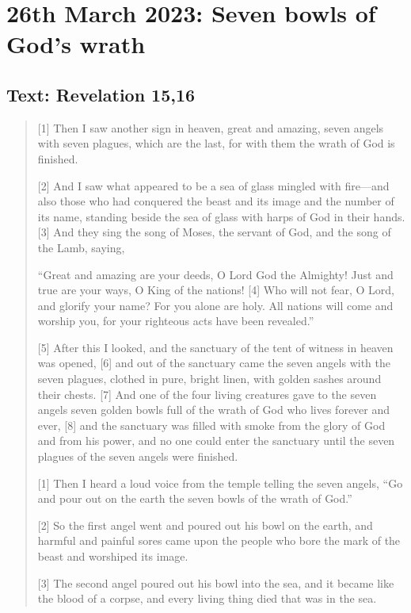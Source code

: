 \setcounter{figure}{0}
\section{26th March 2023: Seven bowls of God's wrath}
\subsection*{Text: Revelation 15,16}
  \begin{quote}
    [1] Then I saw another sign in heaven, great and amazing, seven angels
    with seven plagues, which are the last, for with them the wrath of God is
    finished.

    [2] And I saw what appeared to be a sea of glass mingled with fire—and
    also those who had conquered the beast and its image and the number of
    its name, standing beside the sea of glass with harps of God in their
    hands.  [3] And they sing the song of Moses, the servant of God, and the
    song of the Lamb, saying,

    “Great and amazing are your deeds,
        O Lord God the Almighty!
    Just and true are your ways,
        O King of the nations!
    [4] Who will not fear, O Lord,
        and glorify your name?
    For you alone are holy.
        All nations will come
        and worship you,
    for your righteous acts have been revealed.”


    [5] After this I looked, and the sanctuary of the tent of witness in
    heaven was opened, [6] and out of the sanctuary came the seven angels
    with the seven plagues, clothed in pure, bright linen, with golden sashes
    around their chests.  [7] And one of the four living creatures gave to
    the seven angels seven golden bowls full of the wrath of God who lives
    forever and ever, [8] and the sanctuary was filled with smoke from the
    glory of God and from his power, and no one could enter the sanctuary
    until the seven plagues of the seven angels were finished.

    [1] Then I heard a loud voice from the temple telling the seven angels,
    “Go and pour out on the earth the seven bowls of the wrath of God.”

    [2] So the first angel went and poured out his bowl on the earth, and
    harmful and painful sores came upon the people who bore the mark of the
    beast and worshiped its image.

    [3] The second angel poured out his bowl into the sea, and it became like
    the blood of a corpse, and every living thing died that was in the sea.


\end{quote}

